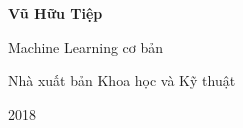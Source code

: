 \thispagestyle{empty}
\begin{flushright}
    
\textbf{\Large Vũ Hữu Tiệp} 

\vspace{8cm}
\Huge{Machine Learning cơ bản} 
\end{flushright}
\vspace{10cm}
\begin{center}

{\large Nhà xuất bản Khoa học và Kỹ thuật }

2018
    
\end{center}